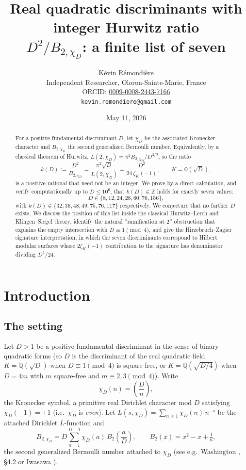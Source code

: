 \documentclass[11pt,reqno]{amsart}
\title[Real quadratic Hurwitz 7-discriminants]{Real quadratic discriminants with integer Hurwitz ratio\\
$D^{2}/B_{2,\chi_D}$: a finite list of seven}
\author[K. R\'emondi\`ere]{K\'evin R\'emondi\`ere\\
\small Independent Researcher, Oloron-Sainte-Marie, France\\
\small ORCID: \href{https://orcid.org/0009-0008-2443-7166}{0009-0008-2443-7166}\\
\small \texttt{kevin.remondiere@gmail.com}}
\date{May 11, 2026}
\theoremstyle{plain}
\theoremstyle{definition}
\newcommand{\Q}{\mathbb{Q}}
\newcommand{\Z}{\mathbb{Z}}
\begin{document}
\begin{abstract}
For a positive fundamental discriminant $D$, let $\chi_{D}$ be the
associated Kronecker character and $B_{2,\chi_{D}}$ the second
generalized Bernoulli number.  Equivalently, by a classical theorem
of Hurwitz, $L(2,\chi_{D})=\pi^{2}B_{2,\chi_{D}}/D^{3/2}$, so the ratio
\[
k(D):=\frac{D^{2}}{B_{2,\chi_{D}}}=\frac{\pi^{2}\sqrt{D}}{L(2,\chi_{D})}
=\frac{D^{2}}{24\,\zeta_{K}(-1)},\qquad K=\Q(\sqrt{D}),
\]
is a positive rational that need not be an integer.  We prove by a
direct calculation, and verify computationally up to $D\le 10^{6}$,
that $k(D)\in\Z$ holds for exactly seven values:
\[
D\in\{8,12,24,28,60,76,156\},
\]
with $k(D)\in\{32,36,48,49,75,76,117\}$ respectively.  We conjecture
that no further $D$ exists.  We discuss the position of this list
inside the classical Hurwitz--Lerch and Klingen--Siegel theory,
identify the natural ``ramification at $2$'' obstruction that
explains the empty intersection with $D\equiv 1\pmod{4}$, and give the
Hirzebruch--Zagier signature interpretation, in which the seven
discriminants correspond to Hilbert modular surfaces whose
$2\zeta_{K}(-1)$ contribution to the signature has denominator
dividing $D^{2}/24$.
\end{abstract}

\maketitle

\section{Introduction}\label{sec:intro}

\subsection{The setting}
Let $D>1$ be a positive fundamental discriminant in the sense of
binary quadratic forms (so $D$ is the discriminant of the real
quadratic field $K=\Q(\sqrt{D})$ when $D\equiv 1\pmod 4$ is
square-free, or $K=\Q(\sqrt{D/4})$ when $D=4m$ with $m$ square-free and
$m\equiv 2,3\pmod 4$).  Write
\[
\chi_{D}(n)=\left(\frac{D}{n}\right),
\]
the Kronecker symbol, a primitive real Dirichlet character mod $D$
satisfying $\chi_{D}(-1)=+1$ (i.e.\ $\chi_{D}$ is \emph{even}).  Let
$L(s,\chi_{D})=\sum_{n\ge 1}\chi_{D}(n)\,n^{-s}$ be the attached
Dirichlet $L$-function and
\[
B_{2,\chi_{D}}=D\sum_{a=1}^{D-1}\chi_{D}(a)\,B_{2}\!\left(\frac{a}{D}\right),\qquad
B_{2}(x)=x^{2}-x+\tfrac{1}{6},
\]
the second generalized Bernoulli number attached to $\chi_{D}$ (see
e.g.\ Washington \cite{Washington1997}, \S 4.2 or Iwasawa
\cite{Iwasawa1972}).
\end{document}
